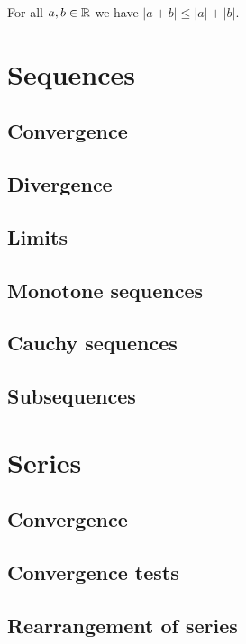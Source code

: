 \begin{theorem}
    For all $a,b\in\mathbb{R}$ we have $|a+b|\leq |a|+|b|$.
\end{theorem}

\section{Sequences}

\subsection{Convergence}

\subsection{Divergence}

\subsection{Limits}

\subsection{Monotone sequences}

\subsection{Cauchy sequences}

\subsection{Subsequences}

\section{Series}

\subsection{Convergence}

\subsection{Convergence tests}

\subsection{Rearrangement of series}

